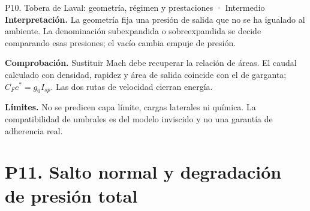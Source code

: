 \begin{studiumworked}{P10. Tobera de Laval: geometría, régimen y prestaciones · Intermedio}
\textbf{Interpretación.} La geometría fija una presión de salida que no se ha igualado al ambiente. La denominación subexpandida o sobreexpandida se decide comparando esas presiones; el vacío cambia empuje de presión.

\textbf{Comprobación.} Sustituir Mach debe recuperar la relación de áreas. El caudal calculado con densidad, rapidez y área de salida coincide con el de garganta; $C_Fc^*=g_0I_{sp}$. Las dos rutas de velocidad cierran energía.

\textbf{Límites.} No se predicen capa límite, cargas laterales ni química. La compatibilidad de umbrales es del modelo inviscido y no una garantía de adherencia real.
\end{studiumworked}
\section{P11. Salto normal y degradación de presión total}
